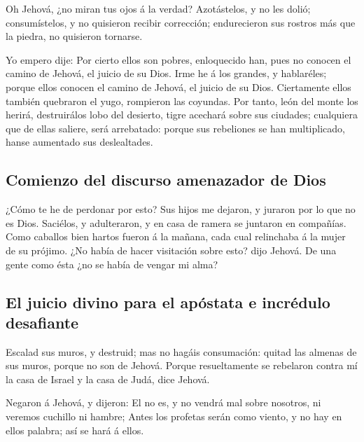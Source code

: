  Oh Jehová, ¿no miran tus ojos á la verdad? Azotástelos, y
no les dolió; consumístelos, y no quisieron recibir corrección;
endurecieron sus rostros más que la piedra, no quisieron tornarse.

 Yo empero dije: Por cierto ellos son pobres, enloquecido
han, pues no conocen el camino de Jehová, el juicio de su Dios.
 Irme he á los grandes, y hablaréles; porque ellos conocen
el camino de Jehová, el juicio de su Dios. Ciertamente ellos también
quebraron el yugo, rompieron las coyundas.  Por tanto,
león del monte los herirá, destruirálos lobo del desierto, tigre
acechará sobre sus ciudades; cualquiera que de ellas saliere, será
arrebatado: porque sus rebeliones se han multiplicado, hanse aumentado
sus deslealtades.

\hypertarget{comienzo-del-discurso-amenazador-de-dios}{%
\subsection{Comienzo del discurso amenazador de
Dios}\label{comienzo-del-discurso-amenazador-de-dios}}

 ¿Cómo te he de perdonar por esto? Sus hijos me dejaron, y
juraron por lo que no es Dios. Saciélos, y adulteraron, y en casa de
ramera se juntaron en compañías.  Como caballos bien
hartos fueron á la mañana, cada cual relinchaba á la mujer de su
prójimo.  ¿No había de hacer visitación sobre esto? dijo
Jehová. De una gente como ésta ¿no se había de vengar mi alma?

\hypertarget{el-juicio-divino-para-el-apuxf3stata-e-incruxe9dulo-desafiante}{%
\subsection{El juicio divino para el apóstata e incrédulo
desafiante}\label{el-juicio-divino-para-el-apuxf3stata-e-incruxe9dulo-desafiante}}

 Escalad sus muros, y destruid; mas no hagáis
consumación: quitad las almenas de sus muros, porque no son de Jehová.
 Porque resueltamente se rebelaron contra mí la casa de
Israel y la casa de Judá, dice Jehová.

 Negaron á Jehová, y dijeron: El no es, y no vendrá mal
sobre nosotros, ni veremos cuchillo ni hambre;  Antes los
profetas serán como viento, y no hay en ellos palabra; así se hará á
ellos.

